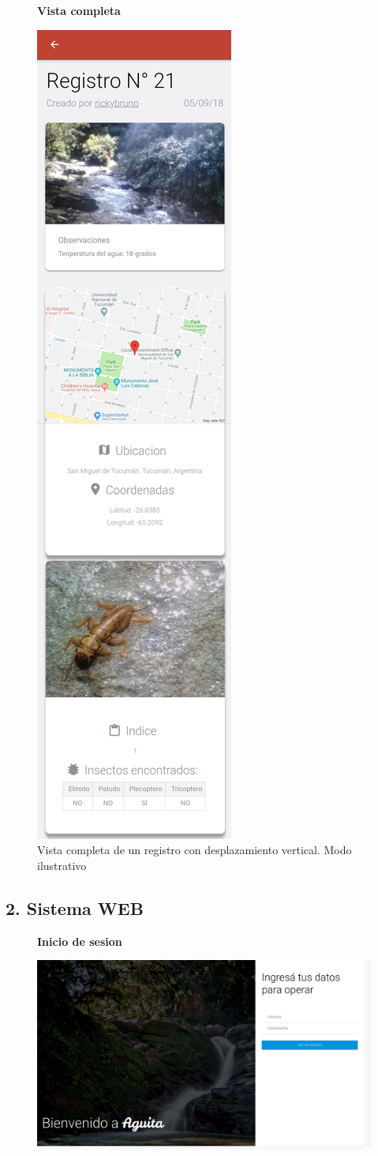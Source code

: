 				\begin{figure}
					\centering
					\textbf{Vista completa}\par\medskip
						\includegraphics[height=1.2\textwidth]{Screenshots/verRegistroCompleto.png}
						\caption{Vista completa de un registro con desplazamiento vertical. Modo ilustrativo}
				\end{figure}

			\subsection{2. Sistema WEB}

				\begin{figure}[H]
					\hspace*{1cm}\raggedright\large\textbf{Inicio de sesion}\par\medskip
					\centering
					\hspace*{-1cm}
						\includegraphics[width=1\textwidth]{Screenshots/web/login.png}
						\hspace*{-1cm}
				\end{figure} 
	
